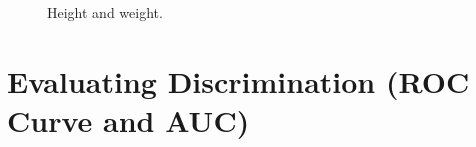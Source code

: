 \documentclass[
  letterpaper,
  DIV=11,
  numbers=noendperiod]{scrartcl}
\begin{document}
\begin{figure}


\caption{\label{fig-result2}Height and weight.}

\end{figure}%

\section{Evaluating Discrimination (ROC Curve and
AUC)}\label{evaluating-discrimination-roc-curve-and-auc}
\end{document}
